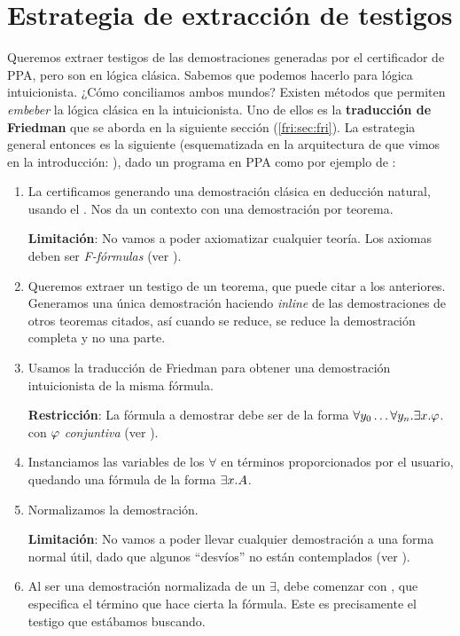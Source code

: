 \section{Estrategia de extracción de testigos}

Queremos extraer testigos de las demostraciones generadas por el certificador de
PPA, pero son en lógica clásica. Sabemos que podemos hacerlo para lógica
intuicionista. ¿Cómo conciliamos ambos mundos? Existen métodos que permiten
\textit{embeber} la lógica clásica en la intuicionista. Uno de ellos es la
\textbf{traducción de Friedman} que se aborda en la siguiente sección (\ref{fri:sec:fri}). La
estrategia general entonces es la siguiente (esquematizada en la arquitectura de \ppaTool{} que vimos en la introducción: ), dado un programa en PPA como
por ejemplo de :
\begin{enumerate}
    \item La certificamos generando una demostración clásica en deducción
          natural, usando el \modCertifier{}. Nos da un contexto con una demostración
          por teorema.

          \textbf{Limitación}: No vamos a poder axiomatizar cualquier teoría. Los axiomas deben ser \textit{F-fórmulas} (ver ).
    \item Queremos extraer un testigo de un teorema, que puede citar a los anteriores. Generamos una única demostración haciendo \textit{inline} de las demostraciones de otros teoremas citados, así cuando se reduce, se reduce la demostración completa y no una parte.
    \item Usamos la traducción de Friedman para obtener una demostración
          intuicionista de la misma fórmula.

          \textbf{Restricción}: La fórmula a demostrar debe ser de la forma
          $\forall y_0 \dots \forall y_n . \exists x . \varphi$. con $\varphi$ \textit{conjuntiva} (ver ).
    \item Instanciamos las variables de los $\forall$ en términos proporcionados
          por el usuario, quedando una fórmula de la forma $\exists x . A$.
    \item Normalizamos la demostración.

          \textbf{Limitación}: No vamos a poder llevar cualquier demostración a una forma normal útil, dado que algunos ``desvíos'' no están contemplados (ver ).

    \item Al ser una demostración normalizada de un $\exists$, debe comenzar con
          , que especifica el término que hace cierta la fórmula. Este
          es precisamente el testigo que estábamos buscando.
          \proofTreeExistsI
\end{enumerate}

